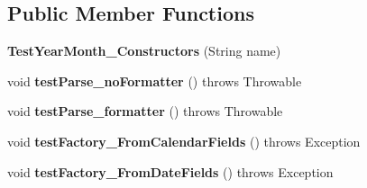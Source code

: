 \subsection*{Public Member Functions}
\begin{DoxyCompactItemize}
\item 
\hypertarget{classorg_1_1joda_1_1time_1_1_test_year_month___constructors_a888ecb9fc881b537fc1d5f5ec53ebe60}{{\bfseries Test\-Year\-Month\-\_\-\-Constructors} (String name)}\label{classorg_1_1joda_1_1time_1_1_test_year_month___constructors_a888ecb9fc881b537fc1d5f5ec53ebe60}

\item 
\hypertarget{classorg_1_1joda_1_1time_1_1_test_year_month___constructors_a1f3f509c00da6d72832ad1cfa184feb9}{void {\bfseries test\-Parse\-\_\-no\-Formatter} ()  throws Throwable }\label{classorg_1_1joda_1_1time_1_1_test_year_month___constructors_a1f3f509c00da6d72832ad1cfa184feb9}

\item 
\hypertarget{classorg_1_1joda_1_1time_1_1_test_year_month___constructors_a76696cddc82a99358b2b560c13d00236}{void {\bfseries test\-Parse\-\_\-formatter} ()  throws Throwable }\label{classorg_1_1joda_1_1time_1_1_test_year_month___constructors_a76696cddc82a99358b2b560c13d00236}

\item 
\hypertarget{classorg_1_1joda_1_1time_1_1_test_year_month___constructors_a523ae4a66d4ce9997ce6e2ccabd409c3}{void {\bfseries test\-Factory\-\_\-\-From\-Calendar\-Fields} ()  throws Exception }\label{classorg_1_1joda_1_1time_1_1_test_year_month___constructors_a523ae4a66d4ce9997ce6e2ccabd409c3}

\item 
\hypertarget{classorg_1_1joda_1_1time_1_1_test_year_month___constructors_aa4c0a2634144723e77a7135a6afbd23a}{void {\bfseries test\-Factory\-\_\-\-From\-Date\-Fields} ()  throws Exception }\label{classorg_1_1joda_1_1time_1_1_test_year_month___constructors_aa4c0a2634144723e77a7135a6afbd23a}


\end{DoxyCompactItemize}
